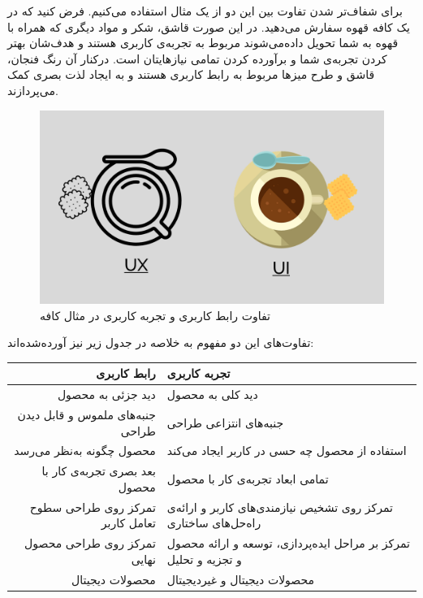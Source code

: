 {\begin{enumerate}[a)]
برای شفاف‌تر شدن تفاوت بین این دو از یک مثال استفاده می‌کنیم. فرض کنید که در یک کافه قهوه سفارش می‌دهید. در این صورت قاشق، شکر و مواد دیگری که همراه با قهوه به شما تحویل داده‌می‌شوند مربوط به تجربه‌ی کاربری هستند و هدف‌شان بهتر کردن تجربه‌ی شما و برآورده کردن تمامی نیازهایتان است. درکنار آن رنگ فنجان، قاشق و طرح میزها مربوط به رابط کاربری هستند و به ایجاد لذت بصری کمک می‌پردازند. 
\begin{figure}[h]
	\centering
	\includegraphics[scale=0.32]{figs/6_1}
	\caption{تفاوت رابط کاربری و تجربه‌ کاربری در مثال کافه}
\end{figure}
\newpage
تفاوت‌های این دو مفهوم به خلاصه در جدول زیر نیز آورده‌شده‌اند:
\begin{center}
    \begin{tabular}{ | r | p{8cm} |}
    \hline
   رابط کاربری & تجربه کاربری \\ \hline
   دید جزئی به محصول & دید کلی به محصول \\ \hline
  جنبه‌های ملموس و قابل دیدن طراحی & جنبه‌های انتزاعی طراحی \\ \hline
    محصول چگونه به‌نظر می‌رسد & استفاده از محصول چه حسی در کاربر ایجاد می‌کند \\ \hline
    بعد بصری تجربه‌ی کار با محصول & تمامی ابعاد تجربه‌ی کار با محصول \\ \hline
    تمرکز روی طراحی سطوح تعامل کاربر  & تمرکز روی تشخیص نیازمندی‌های کاربر و ارائه‌ی راه‌حل‌های ساختاری \\ \hline
  تمرکز روی طراحی محصول نهایی & تمرکز بر مراحل ایده‌پردازی، توسعه و ارائه محصول و تجزیه و تحلیل \\ \hline
    محصولات دیجیتال &  محصولات دیجیتال و غیردیجیتال \\ \hline
    
    \end{tabular}
\end{center}


\end{enumerate}}
